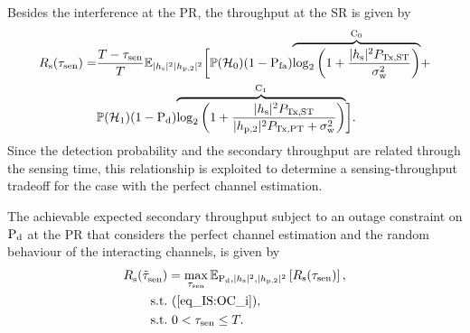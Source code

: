 Besides the interference at the PR, the throughput at the SR is given by %
\begin{align}
R_{\text{s}}(\tau_{\text{sen}}) =& \frac{T - \tau_{\text{sen}}}{T} \mathbb{E}_{|h_{\text{s}}|^2 |h_{\text{p,2}}|^2} \bigg[ \mathbb P(\mathcal{H}_0) (1 - \text{P}_{\text{fa}}) \smash[b]{\overbrace{\log_2 \bigg( 1 + \frac{|h_{\text{s}}|^2 P_{\text{Tx,ST}}}{\sigma^2_{\text{w}}} \bigg)}^{\text{C}_{\text{0}}}} + \nonumber \\ & \mathbb P(\mathcal{H}_1) (1 - \text{P}_{\text{d}}) \smash[b]{\overbrace{\log_2 \bigg( 1 + \frac{|h_{\text{s}}|^2 P_{\text{Tx,ST}}}{|h_{\text{p,2}}|^2 P_{\text{Tx,PT}} + \sigma^2_{\text{w}}} \bigg)}^{\text{C}_{\text{1}}}} \bigg]. \label{eq_IS:thr_i} 
\end{align}
Since the detection probability and the secondary throughput are related through the sensing time, this relationship is exploited to determine a sensing-throughput tradeoff for the case with the perfect channel estimation.
\begin{theorem} \label{th_IS:th3}
\normalfont
The achievable expected secondary throughput subject to an outage constraint on $\text{P}_{\text{d}}$ at the PR that considers the perfect channel estimation and the random behaviour of the interacting channels, is given by
\begin{align}
{R}_{\text{s}}^{\text{}}(\tilde{\tau}_{\text{sen}}^{\text{}}) &= \operatorname*{max}_{\tau_{\text{sen}}} {\mathbb E}_{\text{P}_{\text{d}}, |h_{\text{s}}|^2, |h_{\text{p,2}}|^2}\left[ R_{\text{s}}(\tau_{\text{sen}}) \right], \label{eq_IS:STT_i} \\
\text{s.t.} & \text{ }  (\ref{eq_IS:OC_i}), \nonumber \\ 
\text{s.t.} & \text{ }  0 < \tau_{\text{sen}} \le T. \nonumber
\end{align}
\end{theorem}
